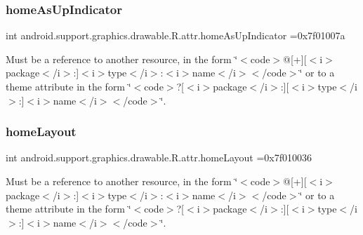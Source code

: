 \subsubsection{\texorpdfstring{home\+As\+Up\+Indicator}{homeAsUpIndicator}}
{\footnotesize\ttfamily int android.\+support.\+graphics.\+drawable.\+R.\+attr.\+home\+As\+Up\+Indicator =0x7f01007a\hspace{0.3cm}{\ttfamily [static]}}

Must be a reference to another resource, in the form \char`\"{}$<$code$>$@\mbox{[}+\mbox{]}\mbox{[}$<$i$>$package$<$/i$>$\+:\mbox{]}$<$i$>$type$<$/i$>$\+:$<$i$>$name$<$/i$>$$<$/code$>$\char`\"{} or to a theme attribute in the form \char`\"{}$<$code$>$?\mbox{[}$<$i$>$package$<$/i$>$\+:\mbox{]}\mbox{[}$<$i$>$type$<$/i$>$\+:\mbox{]}$<$i$>$name$<$/i$>$$<$/code$>$\char`\"{}. \mbox{\label{classandroid_1_1support_1_1graphics_1_1drawable_1_1R_1_1attr_ac848f16dcd4fc6b8f97cf5746d81fb9c}} 
\subsubsection{\texorpdfstring{home\+Layout}{homeLayout}}
{\footnotesize\ttfamily int android.\+support.\+graphics.\+drawable.\+R.\+attr.\+home\+Layout =0x7f010036\hspace{0.3cm}{\ttfamily [static]}}

Must be a reference to another resource, in the form \char`\"{}$<$code$>$@\mbox{[}+\mbox{]}\mbox{[}$<$i$>$package$<$/i$>$\+:\mbox{]}$<$i$>$type$<$/i$>$\+:$<$i$>$name$<$/i$>$$<$/code$>$\char`\"{} or to a theme attribute in the form \char`\"{}$<$code$>$?\mbox{[}$<$i$>$package$<$/i$>$\+:\mbox{]}\mbox{[}$<$i$>$type$<$/i$>$\+:\mbox{]}$<$i$>$name$<$/i$>$$<$/code$>$\char`\"{}. \mbox{\label{classandroid_1_1support_1_1graphics_1_1drawable_1_1R_1_1attr_ae427ff2b20d6460c3df38b8abc719def}} 
